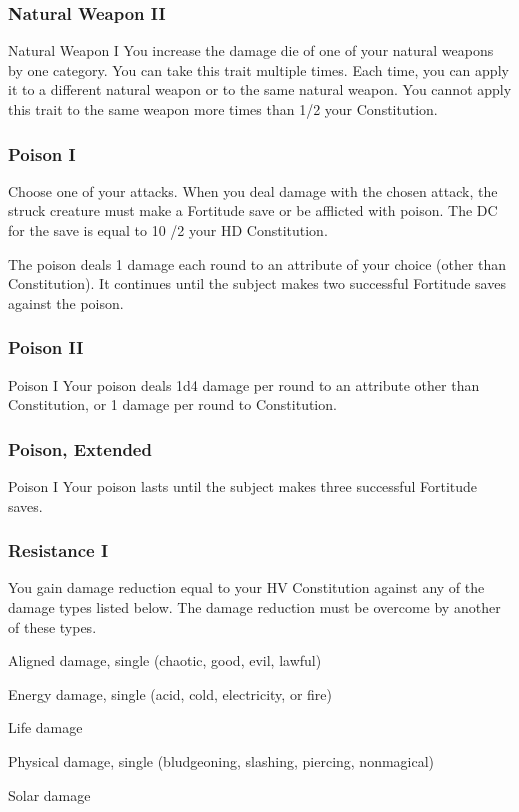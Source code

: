 \subsubsection{Natural Weapon II}
\featpre Natural Weapon I
\featben You increase the damage die of one of your natural weapons by one category.
 You can take this trait multiple times. Each time, you can apply it to a different natural weapon or to the same natural weapon. You cannot apply this trait to the same weapon more times than 1/2 your Constitution. 

\subsubsection{Poison I}
Choose one of your attacks.
\featben When you deal damage with the chosen attack, the struck creature must make a Fortitude save or be afflicted with poison. The DC for the save is equal to 10 /2 your HD \add Constitution.
\par The poison deals 1 damage each round to an attribute of your choice (other than Constitution). It continues until the subject makes two successful Fortitude saves against the poison.

\subsubsection{Poison II}
\featpre Poison I
\featben Your poison deals 1d4 damage per round to an attribute other than Constitution, or 1 damage per round to Constitution.

\subsubsection{Poison, Extended}
\featpre Poison I
\featben Your poison lasts until the subject makes three successful Fortitude saves.

\subsubsection{Resistance I}
\featben You gain damage reduction equal to your HV \add Constitution against any of the damage types listed below. The damage reduction must be overcome by another of these types.
\begin{itemize*}
    \item Aligned damage, single (chaotic, good, evil, lawful)
    \item Energy damage, single (acid, cold, electricity, or fire)
    \item Life damage
    \item Physical damage, single (bludgeoning, slashing, piercing, nonmagical)
    \item Solar damage
\end{itemize*}

